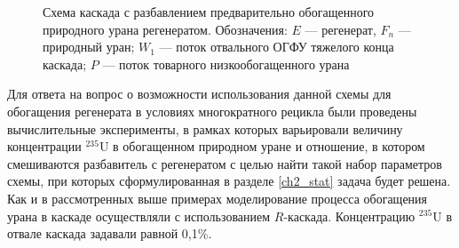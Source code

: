 \begin{figure}[ht]
  \caption{Схема каскада с разбавлением предварительно обогащенного природного урана регенератом. Обозначения: $E$ --- регенерат, $F_n$ --- природный уран; $W_1$ --- поток отвального ОГФУ тяжелого конца каскада; $P$ --- поток товарного низкообогащенного урана}\label{o2}
\end{figure}

Для ответа на вопрос о возможности использования данной схемы для обогащения регенерата в условиях многократного рецикла были проведены вычислительные эксперименты, в рамках которых варьировали величину концентрации $^{235}$U в обогащенном природном уране и отношение, в котором смешиваются разбавитель с регенератом с целью найти такой набор параметров схемы, при которых сформулированная в разделе \ref{ch2_stat} задача будет решена. Как и в рассмотренных выше примерах моделирование процесса обогащения урана в каскаде осуществляли с использованием $R$-каскада. Концентрацию $^{235}$U в отвале каскада задавали равной 0,1\%.

